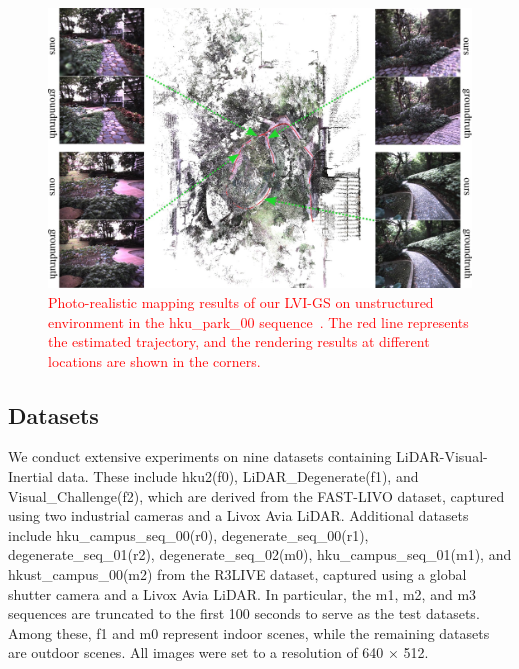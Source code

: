 \documentclass[lettersize,journal]{IEEEtran}
\begin{document}
\begin{figure}  %
    \captionsetup{justification=justified, labelsep=colon} %
    \centering
    \includegraphics[width=1.7\columnwidth]{image/fullseq/fullseq_forest.jpg} %
    \caption{\textcolor{red}{
    Photo-realistic mapping results of our LVI-GS on unstructured environment in the hku_park_00 sequence~\cite{r3live}.
    The red line represents the estimated trajectory, and the rendering results at different locations are shown in the corners.
    }
    }
    \label{fig:fullseq_forest}
\end{figure}

\subsection{Datasets}
We conduct extensive experiments on nine datasets containing LiDAR-Visual-Inertial data. These include hku2(f0), LiDAR_Degenerate(f1), and Visual_Challenge(f2), which are derived from the FAST-LIVO\cite{fastlivo} dataset, captured using two industrial cameras and a Livox Avia LiDAR. Additional datasets include hku_campus_seq_00(r0), degenerate_seq_00(r1), degenerate_seq_01(r2), degenerate_seq_02(m0), hku_campus_seq_01(m1), and hkust_campus_00(m2) from the R3LIVE\cite{r3live} dataset, captured using a global shutter camera and a Livox Avia LiDAR. In particular, the m1, m2, and m3 sequences are truncated to the first 100 seconds to serve as the test datasets. Among these, f1 and m0 represent indoor scenes, while the remaining datasets are outdoor scenes. 
All images were set to a resolution of 640 × 512.
\end{document}
